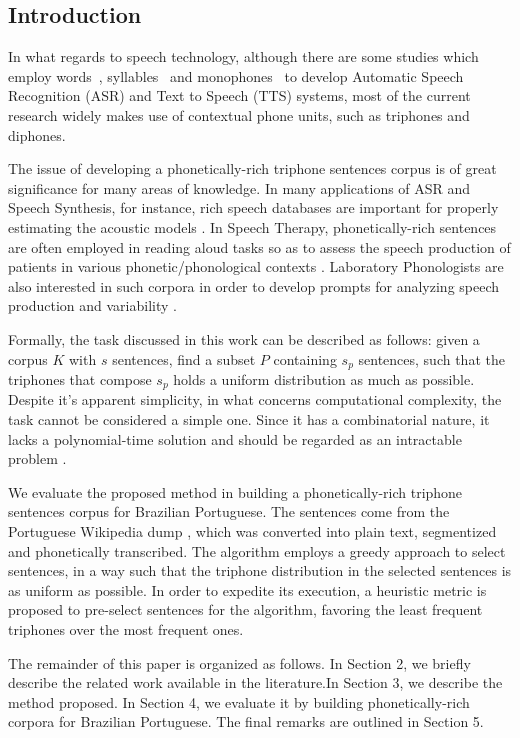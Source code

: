 \subsection{Introduction}

In what regards to speech technology, although there are some studies which employ words~\cite{Thanga2008}, syllables~\cite{Gana2001} and monophones~\cite{Kumar2014} to develop Automatic Speech Recognition (ASR) and Text to Speech (TTS) systems, most of the current research widely makes use of contextual phone units, such as triphones and diphones.

The issue of developing a phonetically-rich triphone sentences corpus is of great significance for many areas 
of knowledge. In many applications of  ASR and Speech Synthesis, for instance, rich speech databases are important for properly estimating the acoustic models \cite{Rabiner2007}. In Speech Therapy, phonetically-rich sentences are often employed in reading aloud tasks so as to assess the speech production of patients in various phonetic/phonological contexts \cite{Mendes2012}. Laboratory Phonologists
are also interested in such corpora in order to develop prompts for analyzing speech production and variability \cite{Pierrehumbert2000}.

Formally, the task discussed in this work can be described as follows: given a corpus $K$ with $s$ sentences,
find a subset $P$ containing $s_p$ sentences, such that the triphones that compose $s_p$ holds a 
uniform distribution as much as possible. Despite it's apparent simplicity, in what concerns computational complexity,
the task cannot be considered a simple one. Since it has a combinatorial nature, it lacks a polynomial-time
solution and should be regarded as an intractable problem \cite{Sedgewick2013}.

We evaluate the proposed method 
in building a phonetically-rich triphone sentences corpus for Brazilian Portuguese. The sentences come from the Portuguese Wikipedia dump 
\cite{Wikidump2014}, which was converted into plain text, segmentized and phonetically transcribed. The algorithm employs 
a greedy approach to select sentences, in a way such that the triphone distribution in the selected sentences is as uniform as possible. In order to expedite its execution, a heuristic metric is proposed 
to pre-select sentences for the algorithm, favoring the least frequent triphones over the most frequent ones.

The remainder of this paper is organized as follows. In Section 2, we briefly describe the related work available in the literature.In Section 3, we describe the method proposed. In Section 4, we evaluate it by building phonetically-rich corpora for Brazilian Portuguese. The final remarks are outlined in Section 5.


